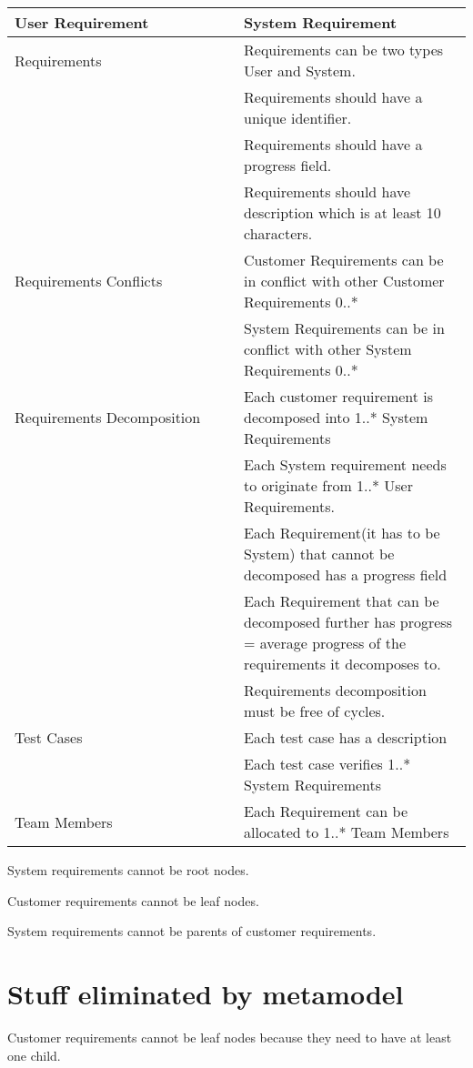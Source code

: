 \documentclass[11pt,a4paper]{scrreprt}
\begin{document}
\begin{center}
	
	\begin{longtable}{| p{0.5\linewidth} | p{0.5\linewidth} |}
	\hline
	\textbf{User Requirement} & \textbf{System Requirement} \\ \hline
	
	Requirements 
	& Requirements can be two types User and System. \\ \hline
	& Requirements should have a unique identifier. \\ \hline
	& Requirements should have a progress  field. \\ \hline
	& Requirements should have description which is at least 10 characters. \\ \hline
	
	Requirements Conflicts 
	& Customer Requirements can be in conflict with other Customer Requirements 0..* \\ \hline
	& System Requirements can be in conflict with other System Requirements 0..* \\ \hline
	
	Requirements Decomposition 
	& Each customer requirement is decomposed into 1..* System Requirements\\ \hline
	& Each System requirement needs to originate from 1..* User Requirements. \\ \hline
	& Each Requirement(it has to be System) that cannot be decomposed has a progress field \\ \hline
	& Each Requirement that can be decomposed further has progress = average progress of the requirements it decomposes to. \\ \hline
	& Requirements decomposition must be free of cycles. \\ \hline
	
	Test Cases
	& Each test case has a description \\ \hline
	& Each test case verifies 1..* System Requirements \\ \hline
	
	Team Members
	& Each Requirement can be allocated to 1..* Team Members\\ \hline
	
	
	\hline
\end{longtable}
\end{center}	

System requirements cannot be root nodes.

Customer requirements cannot be leaf nodes.

System requirements cannot be parents of customer requirements.

\chapter{Stuff eliminated by metamodel}
Customer requirements cannot be leaf nodes because they need to have at least one child.

	
\end{document}
